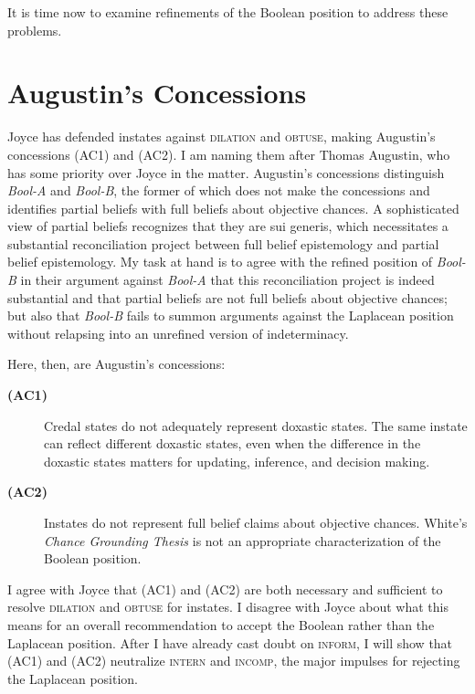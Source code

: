 \documentclass[11pt]{article}
\newcommand{\anderson}[0]{\textit{Bool-A}}
\newcommand{\augustin}[0]{\textit{Bool-B}}
\begin{document}
It is time now to examine refinements of the Boolean position to
address these problems.

\section{Augustin's Concessions}
\label{AugustinsConcessions}

Joyce has defended instates against \textsc{dilation} and
\textsc{obtuse}, making Augustin's concessions (AC1) and (AC2). I am
naming them after Thomas Augustin, who has some priority over Joyce in
the matter. Augustin's concessions distinguish {\anderson} and
{\augustin}, the former of which does not make the concessions and
identifies partial beliefs with full beliefs about objective chances.
A sophisticated view of partial beliefs recognizes that they are sui
generis, which necessitates a substantial reconciliation project
between full belief epistemology and partial belief epistemology. My
task at hand is to agree with the refined position of {\augustin} in
their argument against {\anderson} that this reconciliation project is
indeed substantial and that partial beliefs are not full beliefs about
objective chances; but also that {\augustin} fails to summon arguments
against the Laplacean position without relapsing into an unrefined
version of indeterminacy.

Here, then, are Augustin's concessions:

\begin{description}
\item[{\bf (AC1)}] Credal states do not adequately represent doxastic
  states. The same instate can reflect different doxastic states, even
  when the difference in the doxastic states matters for updating,
  inference, and decision making.
\item[{\bf (AC2)}] Instates do not represent full belief claims about
  objective chances. White's \emph{Chance Grounding Thesis} is not an
  appropriate characterization of the Boolean position.
\end{description}

I agree with Joyce that (AC1) and (AC2) are both necessary and
sufficient to resolve \textsc{dilation} and \textsc{obtuse} for
instates. I disagree with Joyce about what this means for an overall
recommendation to accept the Boolean rather than the Laplacean
position. After I have already cast doubt on \textsc{inform}, I will
show that (AC1) and (AC2) neutralize \textsc{intern} and
\textsc{incomp}, the major impulses for rejecting the Laplacean
position. 
\end{document}

